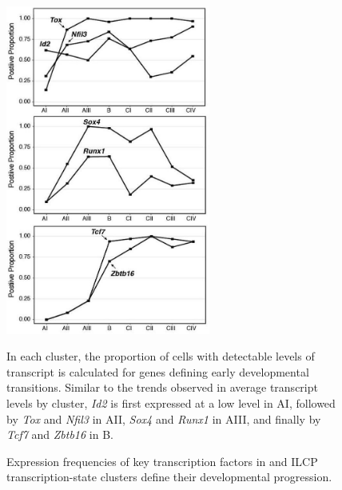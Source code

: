 \begin{figure}[p]
\begin{center}
	\includegraphics[width=0.6\textwidth]{figures/chapter3/S3}
\end{center}
	\caption{Expression frequencies of key transcription factors in \aLP and ILCP transcription-state clusters define their developmental progression.} 
	In each cluster, the proportion of cells with detectable levels of transcript is calculated for genes defining early developmental transitions. Similar to the trends observed in average transcript levels by cluster, \textit{Id2} is first expressed at a low level in AI, followed by \textit{Tox} and \textit{Nfil3} in AII, \textit{Sox4} and \textit{Runx1} in AIII, and finally by \textit{Tcf7} and \textit{Zbtb16} in B.
	\label{fig:chap3_S3}
\end{figure}


\renewcommand\thefigure{\thechapter.\arabic{figure}} 




